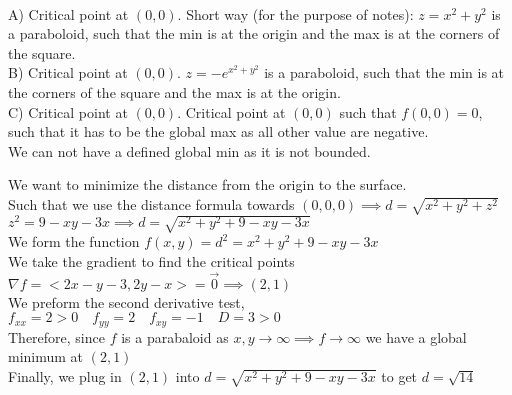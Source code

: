 \documentclass{article}
\begin{document}
\sol \\
A) Critical point at $(0,0)$. Short way (for the purpose of notes): $z=x^2+y^2$ is a paraboloid, such that the min is at the origin and the max is at the corners of the square. \\
B) Critical point at $(0,0)$. $z=-e^{x^2+y^2}$ is a paraboloid, such that the min is at the corners of the square and the max is at the origin. \\
C) Critical point at $(0,0)$.
\noindent Critical point at $(0,0)$ such that $f(0,0) = 0$, such that it has to be the global max as all other value are negative. \\
We can not have a defined global min as it is not bounded.

\newpage

\sol We want to minimize the distance from the origin to the surface. \\
Such that we use the distance formula towards $(0,0,0) \implies d = \sqrt{x^2+y^2+z^2}$ \\
$z^2 = 9-xy-3x \implies d = \sqrt{x^2+y^2+ 9-xy-3x}$ \\
We form the function $ f(x,y) = d^2 = x^2+y^2 +9-xy-3x$ \\
We take the gradient to find the critical points $\nabla f = <2x-y-3, 2y-x> = \vec{0} \implies (2,1)$ \\
We preform the second derivative test, $f_{xx} = 2 > 0 \quad f_{yy} = 2 \quad f_{xy} = -1 \quad D = 3 > 0$ \\
Therefore, since $f$ is a parabaloid as $x,y \to \infty \implies f \to \infty$ we have a global minimum at $(2,1)$ \\
Finally, we plug in $(2,1)$ into $d = \sqrt{x^2+y^2+ 9-xy-3x}$ to get $d = \sqrt{14}$
\end{document}
